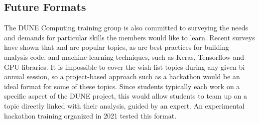 \documentclass[../main-v1.tex]{subfiles}
\begin{document}
\subsection{Future Formats}
The DUNE Computing training group is also committed to surveying the needs and %
demands for particular %
skills the members would like to learn. Recent surveys have shown that  and  are popular topics, as are %
best practices for building analysis code, %
and machine learning techniques, such as Keras, Tensorflow and GPU libraries. %
It is impossible to cover the wish-list topics during any given bi-annual session, %
so a project-based approach such as a hackathon would be an ideal format for some of these topics. Since  students typically each work on a specific aspect of the DUNE project, this would allow students to team up on %
a topic directly linked with their analysis, guided by an expert. %
An experimental hackathon training organized in 2021 tested this format. %



\end{document}
